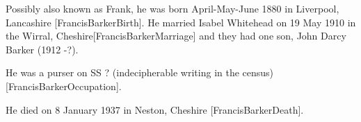 

Possibly also known as Frank, he was born April-May-June 1880 in Liverpool, Lancashire [FrancisBarkerBirth]. He married Isabel Whitehead on 19 May 1910 in the Wirral, Cheshire[FrancisBarkerMarriage] and they had one son, John Darcy Barker (1912 -?). 

He was a purser on SS ? (indecipherable writing in the census)[FrancisBarkerOccupation].

He died on 8 January 1937 in	Neston, Cheshire [FrancisBarkerDeath].
